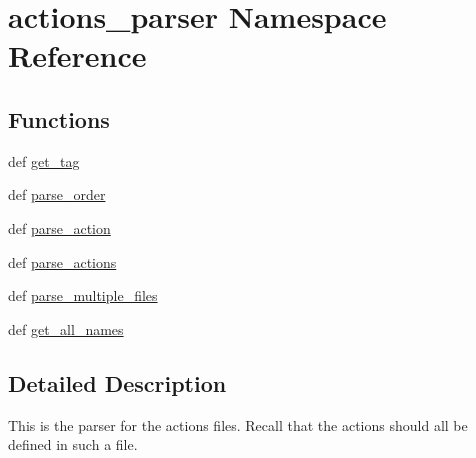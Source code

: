 \hypertarget{namespaceactions__parser}{\section{actions\-\_\-parser \-Namespace \-Reference}
\label{namespaceactions__parser}
}
\subsection*{\-Functions}
\begin{DoxyCompactItemize}
\item 
def \hyperlink{namespaceactions__parser_a6f9569ed6bd47ffda5de8c53c2289a30}{get\-\_\-tag}
\item 
def \hyperlink{namespaceactions__parser_a6a1a49568aa3b80108f39f5e17b215d0}{parse\-\_\-order}
\item 
def \hyperlink{namespaceactions__parser_a23735882d8c95de4cb5b776c0ed0fff8}{parse\-\_\-action}
\item 
def \hyperlink{namespaceactions__parser_a4dd0ce5587c033d53b9518bf9e5adbc1}{parse\-\_\-actions}
\item 
def \hyperlink{namespaceactions__parser_a7c5da1e79a86cb2615ea3e93fb37205d}{parse\-\_\-multiple\-\_\-files}
\item 
def \hyperlink{namespaceactions__parser_a7665b4476ad82c1297577d6651e84afb}{get\-\_\-all\-\_\-names}
\end{DoxyCompactItemize}


\subsection{\-Detailed \-Description}
\begin{DoxyVerb}
This is the parser for the actions files.
Recall that the actions should all be defined in such a file.
\end{DoxyVerb}
 

